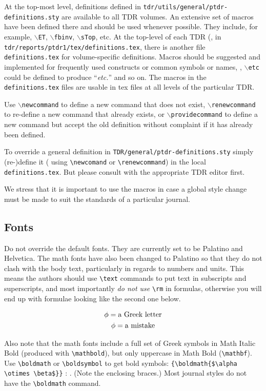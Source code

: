 At the top-most level, definitions defined in
{\texttt{tdr/utils/general/ptdr-definitions.sty}} are
available to all TDR volumes. An extensive set of macros have been
defined there and should be used whenever possible. They include, for
example, $\backslash$\texttt{ET}, $\backslash$\texttt{fbinv},
$\backslash$\texttt{sTop}, etc.
At the top-level of each TDR
(\eg, in \texttt{tdr/reports/ptdr1/tex/definitions.tex}, there is another
file \texttt{definitions.tex} for volume-specific definitions. Macros
should be suggested and implemented for
frequently used constructs or common symbols or names, \eg,
{$\backslash$\texttt{etc}}
could be defined to produce ``\emph{etc.}'' and so on.
The macros in the \texttt{definitions.tex} files are usable
in tex files at all levels of the particular TDR.

Use {$\backslash$\texttt{newcommand}} to define a new command that does not exist,
{$\backslash$\texttt{renewcommand}} to re-define a new command that already exists,
or {$\backslash$\texttt{providecommand}} to define a new command but accept the old
definition without complaint if it has already been defined.

To override a general definition in \texttt{TDR/general/ptdr-definitions.sty}
simply (re-)define it ( using \verb|\newcomand| or \verb|\renewcommand|) in the local \texttt{definitions.tex}. But please
consult with the appropriate TDR editor first.

We stress that it is important to use the macros in case a global style change must be made to suit the standards of a particular journal.

\subsection{Fonts}
Do not override the default fonts. They are currently set to be
Palatino and Helvetica. The math fonts have also been changed to
Palatino so that they do not clash with the body text,
particularly in regards to numbers and units. This means the
authors should use \verb|\text| commands to put text in subscripts
and superscripts, and most importantly \emph{do not use}
\verb|\rm| in formulas, otherwise you will end up with formulae looking like the second one below.

\begin{gather}
\phi = \text{a Greek letter}\\
{\rm \phi} = \text{a mistake}
\end{gather}

Also note that the math fonts include a full set of Greek symbols in Math Italic Bold (produced with \verb|\mathbold|),
but only uppercase in Math Bold (\verb|\mathbf|). Use \verb|\boldmath| or \verb|\boldsymbol| to get bold symbols: \verb|{\boldmath{$\alpha \otimes \beta$}}| : {\boldmath{$\alpha \otimes \beta$}}. (Note the enclosing braces.) Most journal styles do not have the \verb|\boldmath| command.



